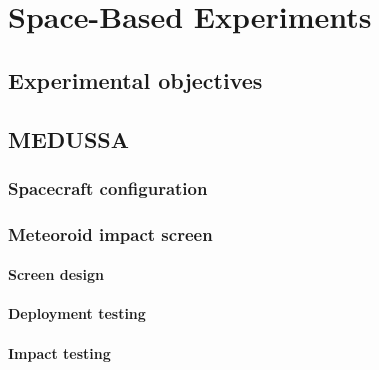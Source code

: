 
\chapter{Space-Based Experiments}
\label{ch.SpaceBasedExperiments}

\section{Experimental objectives}

\section{MEDUSSA}
\subsection{Spacecraft configuration}
\subsection{Meteoroid impact screen}
\subsubsection{Screen design}
\subsubsection{Deployment testing}
\subsubsection{Impact testing}